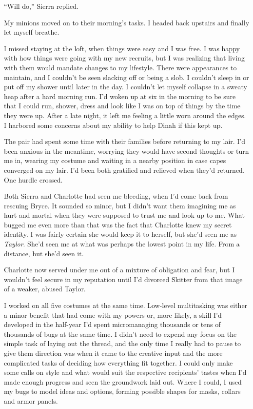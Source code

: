 ``Will do,'' Sierra replied.



My minions moved on to their morning's tasks.  I headed back upstairs and finally let myself breathe.



I missed staying at the loft, when things were easy and I was free.  I was happy with how things were going with my new recruits, but I was realizing that living with them would mandate changes to my lifestyle.  There were appearances to maintain, and I couldn't be seen slacking off or being a slob.  I couldn't sleep in or put off my shower until later in the day.  I couldn't let myself collapse in a sweaty heap after a hard morning run.  I'd woken up at six in the morning to be sure that I could run, shower, dress and look like I was on top of things by the time they were up.  After a late night, it left me feeling a little worn around the edges.  I harbored some concerns about my ability to help Dinah if this kept up.



The pair had spent some time with their families before returning to my lair.  I'd been anxious in the meantime, worrying they would have second thoughts or turn me in, wearing my costume and waiting in a nearby position in case capes converged on my lair. I'd been both gratified and relieved when they'd returned.  One hurdle crossed.



Both Sierra and Charlotte had seen me bleeding, when I'd come back from rescuing Bryce.  It sounded so minor, but I didn't want them imagining me as hurt and mortal when they were supposed to trust me and look up to me.  What bugged me even more than that was the fact that Charlotte knew my secret identity. I was fairly certain she would keep it to herself, but she'd seen me as \emph{Taylor}.  She'd seen me at what was perhaps the lowest point in my life.  From a distance, but she'd seen it.



Charlotte now served under me out of a mixture of obligation and fear, but I wouldn't feel secure in my reputation until I'd divorced Skitter from that image of a weaker, abused Taylor.



I worked on all five costumes at the same time.  Low-level multitasking was either a minor benefit that had come with my powers or, more likely, a skill I'd developed in the half-year I'd spent micromanaging thousands or tens of thousands of bugs at the same time.  I didn't need to expend any focus on the simple task of laying out the thread, and the only time I really had to pause to give them direction was when it came to the creative input and the more complicated tasks of deciding how everything fit together.  I could only make some calls on style and what would suit the respective recipients' tastes when I'd made enough progress and seen the groundwork laid out.  Where I could, I used my bugs to model ideas and options, forming possible shapes for masks, collars and armor panels.



